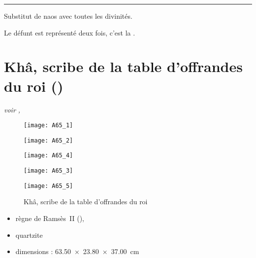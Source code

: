 \documentclass[dvipsnames,a4paper,twoside,10pt,openany,article]{memoir}
\newcommand{\separation}{%
  {\noi\hspace*{\fill}\rule{.33\textwidth}{1pt}\hspace*{\fill}}%
}
\begin{document}
\separation

Substitut de naos avec toutes les divinités.

Le défunt est représenté deux fois, c'est la \og {} \fg.


\chapter{Khâ, scribe de la table d'offrandes du roi ()}
\label{sec:A65}

\puceb{} \emph{voir , }
\bigskip

\begin{figure}[!h]
  \noi\begin{minipage}[m]{4cm}
    \centerfloat
    \texttt{[image: A65\_1]}
  \end{minipage}%
  \qquad%
  \begin{minipage}[m]{4cm}
    \centerfloat
    \texttt{[image: A65\_2]}
  \end{minipage}%
  \qquad%
  \begin{minipage}[m]{4cm}
    \centerfloat
    \texttt{[image: A65\_4]}
  \end{minipage}

  \bigskip

  \noi\begin{minipage}[m]{4cm}
    \centerfloat
    \texttt{[image: A65\_3]}
  \end{minipage}%
  \qquad%
  \begin{minipage}[m]{4cm}
    \centerfloat
    \texttt{[image: A65\_5]}
  \end{minipage}%
  \caption{Khâ, scribe de la table d'offrandes du roi 
           }
  \label{fig:A65}
\end{figure}

\begin{itemize}
  \item règne de Ramsès~II (), 
  \item quartzite
  \item dimensions : \SI{63.50x23.80x37.00}{\cm}
\end{itemize}
\end{document}

